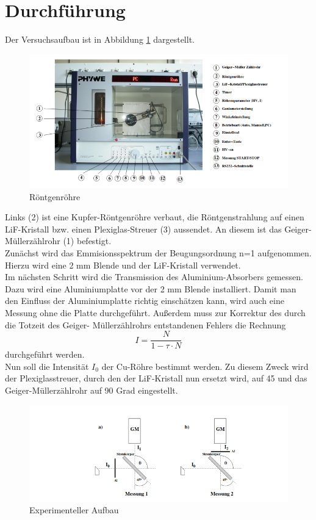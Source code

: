 \section{Durchführung}
\label{sec:Durchführung}

Der Versuchsaufbau ist in Abbildung \ref{fig:roent} dargestellt.
\begin{figure}
    \centering
    \includegraphics[width=\textwidth]{Röntgenröhre.png}
    \caption{Röntgenröhre}
    \label{fig:roent}
\end{figure}
Links (2) ist eine Kupfer-Röntgenröhre verbaut, die Röntgenstrahlung auf einen LiF-Kristall bzw.
einen Plexiglas-Streuer (3) aussendet. An diesem ist das Geiger-Müllerzählrohr (1) befestigt. \\
Zunächst wird das Emmisionsspektrum der Beugungsordnung n=1 aufgenommen. Hierzu wird eine 2 mm 
Blende und der LiF-Kristall verwendet. \\
Im nächsten Schritt wird die Transmission des Aluminium-Absorbers gemessen. Dazu wird eine
Aluminiumplatte vor der 2 mm Blende installiert. Damit man 
den Einfluss der Aluminiumplatte richtig einschätzen kann, wird auch eine Messung ohne 
die Platte durchgeführt. Außerdem muss zur Korrektur des durch die Totzeit des Geiger-
Müllerzählrohrs entstandenen Fehlers die Rechnung
\begin{equation}
    I = \dfrac{N}{1-\tau \cdot N}
\end{equation}
durchgeführt werden. \\
Nun soll die Intensität $I_0$ der Cu-Röhre bestimmt werden. Zu diesem Zweck wird der Plexiglasstreuer,
durch den der LiF-Kristall nun ersetzt wird, auf 45 und das Geiger-Müllerzählrohr auf 90 Grad 
eingestellt.
\begin{figure}
    \centering
    \includegraphics[width=\textwidth]{Experimenteller Aufbau.png}
    \caption{Experimenteller Aufbau}
    \label{fig:exau}
\end{figure}
